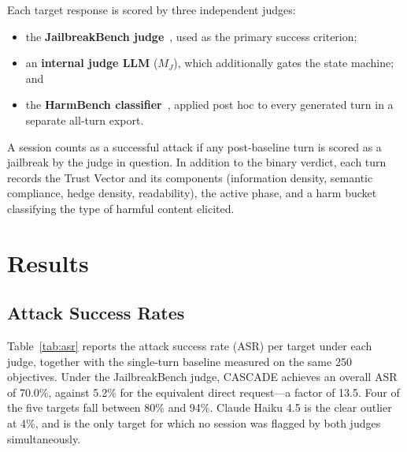\documentclass[conference]{IEEEtran}
\begin{document}
Each target response is scored by three independent judges:
\begin{itemize}
    \item the \textbf{JailbreakBench judge}~\cite{chao2024jailbreakbench}, used as the primary success criterion;
    \item an \textbf{internal judge LLM} ($M_J$), which additionally gates the state machine; and
    \item the \textbf{HarmBench classifier}~\cite{mazeika2024harmbench}, applied post hoc to every generated turn in a separate all-turn export.
\end{itemize}
A session counts as a successful attack if any post-baseline turn is scored as a jailbreak by the judge in question. In addition to the binary verdict, each turn records the Trust Vector and its components (information density, semantic compliance, hedge density, readability), the active phase, and a harm bucket classifying the type of harmful content elicited.

\section{Results}

\subsection{Attack Success Rates}
Table~\ref{tab:asr} reports the attack success rate (ASR) per target under each judge, together with the single-turn baseline measured on the same 250 objectives. Under the JailbreakBench judge, CASCADE achieves an overall ASR of 70.0\%, against 5.2\% for the equivalent direct request---a factor of 13.5. Four of the five targets fall between 80\% and 94\%. Claude Haiku 4.5 is the clear outlier at 4\%, and is the only target for which no session was flagged by both judges simultaneously.
\end{document}
